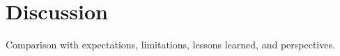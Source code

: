\section*{Discussion}

Comparison with expectations, limitations, lessons learned, and perspectives.

\cite{greenwade93}
